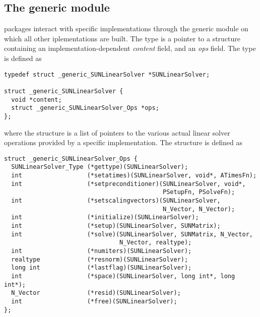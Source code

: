 \bigskip


\subsection{The generic  module}\label{ss:sunlinsol_Generic}

{\sundials} packages interact with specific {\sunlinsol} implementations
through the generic {\sunlinsol} module on which all other {\sunlinsol}
iplementations are built.  The  type is a pointer
to a structure containing an implementation-dependent \emph{content} field,
and an \emph{ops} field.  The type  is defined as
\begin{verbatim}
typedef struct _generic_SUNLinearSolver *SUNLinearSolver;

struct _generic_SUNLinearSolver {
  void *content;
  struct _generic_SUNLinearSolver_Ops *ops;
};
\end{verbatim}
where the  structure is a list of
pointers to the various actual linear solver operations provided by a
specific implementation.  The 
structure is defined as
\begin{verbatim}
struct _generic_SUNLinearSolver_Ops {
  SUNLinearSolver_Type (*gettype)(SUNLinearSolver);
  int                  (*setatimes)(SUNLinearSolver, void*, ATimesFn);
  int                  (*setpreconditioner)(SUNLinearSolver, void*,
                                            PSetupFn, PSolveFn);
  int                  (*setscalingvectors)(SUNLinearSolver,
                                            N_Vector, N_Vector);
  int                  (*initialize)(SUNLinearSolver);
  int                  (*setup)(SUNLinearSolver, SUNMatrix);
  int                  (*solve)(SUNLinearSolver, SUNMatrix, N_Vector,
                                N_Vector, realtype);
  int                  (*numiters)(SUNLinearSolver);
  realtype             (*resnorm)(SUNLinearSolver);
  long int             (*lastflag)(SUNLinearSolver);
  int                  (*space)(SUNLinearSolver, long int*, long int*);
  N_Vector             (*resid)(SUNLinearSolver);
  int                  (*free)(SUNLinearSolver);
};
\end{verbatim}

